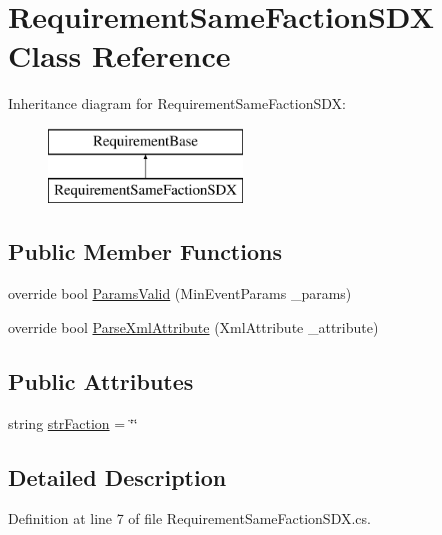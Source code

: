 \hypertarget{class_requirement_same_faction_s_d_x}{}\section{Requirement\+Same\+Faction\+S\+DX Class Reference}
\label{class_requirement_same_faction_s_d_x}
Inheritance diagram for Requirement\+Same\+Faction\+S\+DX\+:\begin{figure}[H]
\begin{center}
\leavevmode
\includegraphics[height=2.000000cm]{d8/dd0/class_requirement_same_faction_s_d_x}
\end{center}
\end{figure}
\subsection*{Public Member Functions}
\begin{DoxyCompactItemize}
\item 
override bool \mbox{\hyperlink{class_requirement_same_faction_s_d_x_a20ff46c575dc2f656a3b5118f3b408c4}{Params\+Valid}} (Min\+Event\+Params \+\_\+params)
\item 
override bool \mbox{\hyperlink{class_requirement_same_faction_s_d_x_a28642bcc34d76d4f0fab111cf977bf64}{Parse\+Xml\+Attribute}} (Xml\+Attribute \+\_\+attribute)
\end{DoxyCompactItemize}
\subsection*{Public Attributes}
\begin{DoxyCompactItemize}
\item 
string \mbox{\hyperlink{class_requirement_same_faction_s_d_x_ab7f842920d0534c80a83f9da70b7fbd8}{str\+Faction}} = \char`\"{}\char`\"{}
\end{DoxyCompactItemize}


\subsection{Detailed Description}


Definition at line 7 of file Requirement\+Same\+Faction\+S\+D\+X.\+cs.



